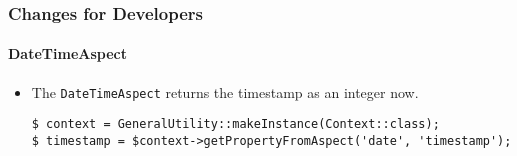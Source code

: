 %

\begin{frame}[fragile]
	\frametitle{Changes for Developers}
	\framesubtitle{DateTimeAspect}


	\begin{itemize}
		\item The \texttt{DateTimeAspect} returns the timestamp as an integer now.
\begin{lstlisting}
$ context = GeneralUtility::makeInstance(Context::class);
$ timestamp = $context->getPropertyFromAspect('date', 'timestamp');
\end{lstlisting}

	\end{itemize}

\end{frame}

